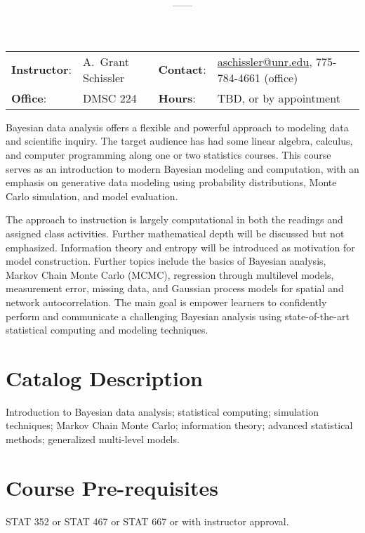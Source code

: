 \documentclass[11pt,onecolumn]{article}
\title{\textbf{\coursename}}
\author{{\semester}---{\roomnumb}---{\classtimes}}
\date{}
\makeatletter
\newcommand{\myname}{A.~Grant Schissler}
\newcommand{\myemail}{aschissler@unr.edu}
\newcommand{\office}{DMSC 224}
\newcommand{\officehours}{TBD, or by appointment}
\makeatother
\begin{document}
\maketitle

\noindent\makebox[\linewidth]{\rule{\textwidth}{1pt}}

\begin{center}
\begin{tabular}{llll}
\textbf{Instructor}:&\myname & \textbf{Contact}:&\href{mailto:\myemail}{\myemail}, 775-784-4661 (office)\\
\textbf{Office}:&\office & \textbf{Hours}:&\officehours\\
\end{tabular}
\end{center}

Bayesian data analysis offers a flexible and powerful approach to modeling data and scientific inquiry. The target audience has had some linear algebra, calculus, and computer programming along one or two statistics courses. This course serves as an introduction to modern Bayesian modeling and computation, with an emphasis on generative data modeling using probability distributions, Monte Carlo simulation, and model evaluation.

The approach to instruction is largely computational in both the readings and assigned class activities. Further mathematical depth will be discussed but not emphasized. Information theory and entropy will be introduced as motivation for model construction. Further topics include the basics of Bayesian analysis, Markov Chain Monte Carlo (MCMC), regression through multilevel models, measurement error, missing data, and Gaussian process models for spatial and network autocorrelation. The main goal is empower learners to confidently perform and communicate a challenging Bayesian analysis using state-of-the-art statistical computing and modeling techniques. 

\section*{Catalog Description}
Introduction to Bayesian data analysis; statistical computing; simulation techniques; Markov Chain Monte Carlo; information theory; advanced statistical methods; generalized multi-level models.

\section*{Course Pre-requisites}
STAT 352 or STAT 467 or STAT 667 or with instructor approval.
\end{document}
